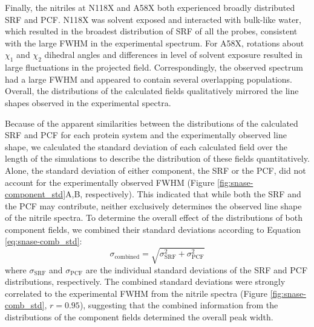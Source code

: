 Finally, the nitriles at N118X and A58X both experienced broadly distributed SRF and PCF. 
N118X was solvent exposed and interacted with bulk-like water, which resulted in the broadest distribution of SRF of all the probes, consistent with the large FWHM in the experimental spectrum. 
For A58X, rotations about $\chi_1$ and $\chi_2$ dihedral angles and differences in level of solvent exposure resulted in large fluctuations in the projected field. 
Correspondingly, the observed spectrum had a large FWHM and appeared to contain several overlapping populations. 
Overall, the distributions of the calculated fields qualitatively mirrored the line shapes observed in the experimental spectra.

Because of the apparent similarities between the distributions of the calculated SRF and PCF for each protein system and the experimentally observed line shape, we calculated the standard deviation of each calculated field over the length of the simulations to describe the distribution of these fields quantitatively. 
Alone, the standard deviation of either component, the SRF or the PCF, did not account for the experimentally observed FWHM (Figure \ref{fig:snase-component_std}A,B, respectively). 
This indicated that while both the SRF and the PCF may contribute, neither exclusively determines the observed line shape of the nitrile spectra. 
To determine the overall effect of the distributions of both component fields, we combined their standard deviations according to Equation \ref{eq:snase-comb_std}:
\begin{equation}
    \sigma_\text{combined}=\sqrt{\sigma^2_\text{SRF}+\sigma^2_\text{PCF}}
    \label{eq:snase-comb_std}
\end{equation}
where $\sigma_\text{SRF}$ and $\sigma_\text{PCF}$ are the individual standard deviations of the SRF and PCF distributions, respectively. 
The combined standard deviations were strongly correlated to the experimental FWHM from the nitrile spectra (Figure \ref{fig:snase-comb_std}, $r = 0.95$), suggesting that the combined information from the distributions of the component fields determined the overall peak width.

